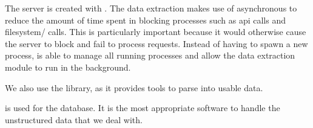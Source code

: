 The server is created with . The data extraction makes use of asynchronous  to reduce the amount of time spent in blocking processes such as api calls and filesystem/ calls. This is particularly important because it would otherwise cause the server to block and fail to process requests. Instead of having to spawn a new process,  is able to manage all running processes and allow the data extraction module to run in the background.

We also use the  library, as it provides tools to parse  into usable data.

 is used for the database. It is the most appropriate software to handle the unstructured data that we deal with.

\newpage
